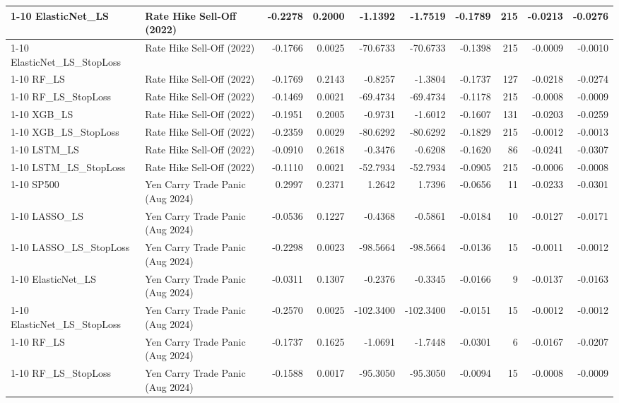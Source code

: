 \begin{tabular}{llrrrrrrrr}
\cline{1-10}
ElasticNet\_LS & Rate Hike Sell-Off (2022) & -0.2278 & 0.2000 & -1.1392 & -1.7519 & -0.1789 & 215 & -0.0213 & -0.0276 \\
\cline{1-10}
ElasticNet\_LS\_StopLoss & Rate Hike Sell-Off (2022) & -0.1766 & 0.0025 & -70.6733 & -70.6733 & -0.1398 & 215 & -0.0009 & -0.0010 \\
\cline{1-10}
RF\_LS & Rate Hike Sell-Off (2022) & -0.1769 & 0.2143 & -0.8257 & -1.3804 & -0.1737 & 127 & -0.0218 & -0.0274 \\
\cline{1-10}
RF\_LS\_StopLoss & Rate Hike Sell-Off (2022) & -0.1469 & 0.0021 & -69.4734 & -69.4734 & -0.1178 & 215 & -0.0008 & -0.0009 \\
\cline{1-10}
XGB\_LS & Rate Hike Sell-Off (2022) & -0.1951 & 0.2005 & -0.9731 & -1.6012 & -0.1607 & 131 & -0.0203 & -0.0259 \\
\cline{1-10}
XGB\_LS\_StopLoss & Rate Hike Sell-Off (2022) & -0.2359 & 0.0029 & -80.6292 & -80.6292 & -0.1829 & 215 & -0.0012 & -0.0013 \\
\cline{1-10}
LSTM\_LS & Rate Hike Sell-Off (2022) & -0.0910 & 0.2618 & -0.3476 & -0.6208 & -0.1620 & 86 & -0.0241 & -0.0307 \\
\cline{1-10}
LSTM\_LS\_StopLoss & Rate Hike Sell-Off (2022) & -0.1110 & 0.0021 & -52.7934 & -52.7934 & -0.0905 & 215 & -0.0006 & -0.0008 \\
\cline{1-10}
SP500 & Yen Carry Trade Panic (Aug 2024) & 0.2997 & 0.2371 & 1.2642 & 1.7396 & -0.0656 & 11 & -0.0233 & -0.0301 \\
\cline{1-10}
LASSO\_LS & Yen Carry Trade Panic (Aug 2024) & -0.0536 & 0.1227 & -0.4368 & -0.5861 & -0.0184 & 10 & -0.0127 & -0.0171 \\
\cline{1-10}
LASSO\_LS\_StopLoss & Yen Carry Trade Panic (Aug 2024) & -0.2298 & 0.0023 & -98.5664 & -98.5664 & -0.0136 & 15 & -0.0011 & -0.0012 \\
\cline{1-10}
ElasticNet\_LS & Yen Carry Trade Panic (Aug 2024) & -0.0311 & 0.1307 & -0.2376 & -0.3345 & -0.0166 & 9 & -0.0137 & -0.0163 \\
\cline{1-10}
ElasticNet\_LS\_StopLoss & Yen Carry Trade Panic (Aug 2024) & -0.2570 & 0.0025 & -102.3400 & -102.3400 & -0.0151 & 15 & -0.0012 & -0.0012 \\
\cline{1-10}
RF\_LS & Yen Carry Trade Panic (Aug 2024) & -0.1737 & 0.1625 & -1.0691 & -1.7448 & -0.0301 & 6 & -0.0167 & -0.0207 \\
\cline{1-10}
RF\_LS\_StopLoss & Yen Carry Trade Panic (Aug 2024) & -0.1588 & 0.0017 & -95.3050 & -95.3050 & -0.0094 & 15 & -0.0008 & -0.0009 \\

\end{tabular}

